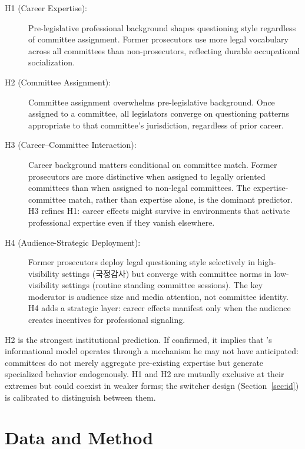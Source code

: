 \documentclass[11pt]{article}
\begin{document}
\begin{description}
\item[H1 (Career Expertise):] Pre-legislative professional background shapes questioning style regardless of committee assignment. Former prosecutors use more legal vocabulary across all committees than non-prosecutors, reflecting durable occupational socialization.

\item[H2 (Committee Assignment):] Committee assignment overwhelms pre-legislative background. Once assigned to a committee, all legislators converge on questioning patterns appropriate to that committee's jurisdiction, regardless of prior career.

\item[H3 (Career--Committee Interaction):] Career background matters conditional on committee match. Former prosecutors are more distinctive when assigned to legally oriented committees than when assigned to non-legal committees. The expertise-committee match, rather than expertise alone, is the dominant predictor. H3 refines H1: career effects might survive in environments that activate professional expertise even if they vanish elsewhere.

\item[H4 (Audience-Strategic Deployment):] Former prosecutors deploy legal questioning style selectively in high-visibility settings (국정감사) but converge with committee norms in low-visibility settings (routine standing committee sessions). The key moderator is audience size and media attention, not committee identity. H4 adds a strategic layer: career effects manifest only when the audience creates incentives for professional signaling.
\end{description}

H2 is the strongest institutional prediction. If confirmed, it implies that \citeauthor{krehbiel1991}'s informational model operates through a mechanism he may not have anticipated: committees do not merely aggregate pre-existing expertise but generate specialized behavior endogenously. H1 and H2 are mutually exclusive at their extremes but could coexist in weaker forms; the switcher design (Section~\ref{sec:id}) is calibrated to distinguish between them.


\section{Data and Method}
\label{sec:data}
\end{document}
